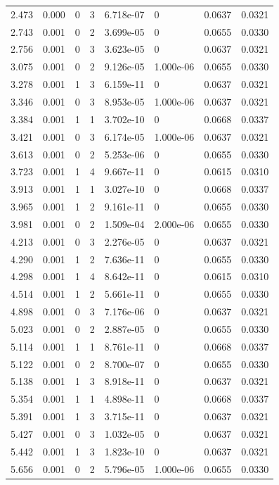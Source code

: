 \documentclass[preview]{standalone}
\begin{document}
{{\begin{tabular}{L{1.2cm}C{1.2cm} C{0.3cm}C{0.5cm} C{1.4cm}C{1.4cm} C{1.4cm}C{1.4cm}}
  2.473  &  0.000  & 0     &  3 &  6.718e-07  & 0  & 0.0637 &  0.0321   \\ 
  2.743  &  0.001  & 0     &  2 &  3.699e-05  & 0  & 0.0655 &  0.0330   \\ 
  2.756  &  0.001  & 0     &  3 &  3.623e-05  & 0  & 0.0637 &  0.0321   \\ 
  3.075  &  0.001  & 0     &  2 &  9.126e-05  & 1.000e-06  & 0.0655 &  0.0330   \\ 
  3.278  &  0.001  & 1     &  3 &  6.159e-11  & 0  & 0.0637 &  0.0321   \\ 
  3.346  &  0.001  & 0     &  3 &  8.953e-05  & 1.000e-06  & 0.0637 &  0.0321   \\ 
  3.384  &  0.001  & 1     &  1 &  3.702e-10  & 0  & 0.0668 &  0.0337   \\ 
  3.421  &  0.001  & 0     &  3 &  6.174e-05  & 1.000e-06  & 0.0637 &  0.0321   \\ 
  3.613  &  0.001  & 0     &  2 &  5.253e-06  & 0  & 0.0655 &  0.0330   \\ 
  3.723  &  0.001  & 1     &  4 &  9.667e-11  & 0  & 0.0615 &  0.0310   \\ 
  3.913  &  0.001  & 1     &  1 &  3.027e-10  & 0  & 0.0668 &  0.0337   \\ 
  3.965  &  0.001  & 1     &  2 &  9.161e-11  & 0  & 0.0655 &  0.0330   \\ 
  3.981  &  0.001  & 0     &  2 &  1.509e-04  & 2.000e-06  & 0.0655 &  0.0330   \\ 
  4.213  &  0.001  & 0     &  3 &  2.276e-05  & 0  & 0.0637 &  0.0321   \\ 
  4.290  &  0.001  & 1     &  2 &  7.636e-11  & 0  & 0.0655 &  0.0330   \\ 
  4.298  &  0.001  & 1     &  4 &  8.642e-11  & 0  & 0.0615 &  0.0310   \\ 
  4.514  &  0.001  & 1     &  2 &  5.661e-11  & 0  & 0.0655 &  0.0330   \\ 
  4.898  &  0.001  & 0     &  3 &  7.176e-06  & 0  & 0.0637 &  0.0321   \\ 
  5.023  &  0.001  & 0     &  2 &  2.887e-05  & 0  & 0.0655 &  0.0330   \\ 
  5.114  &  0.001  & 1     &  1 &  8.761e-11  & 0  & 0.0668 &  0.0337   \\ 
  5.122  &  0.001  & 0     &  2 &  8.700e-07  & 0  & 0.0655 &  0.0330   \\ 
  5.138  &  0.001  & 1     &  3 &  8.918e-11  & 0  & 0.0637 &  0.0321   \\ 
  5.354  &  0.001  & 1     &  1 &  4.898e-11  & 0  & 0.0668 &  0.0337   \\ 
  5.391  &  0.001  & 1     &  3 &  3.715e-11  & 0  & 0.0637 &  0.0321   \\ 
  5.427  &  0.001  & 0     &  3 &  1.032e-05  & 0  & 0.0637 &  0.0321   \\ 
  5.442  &  0.001  & 1     &  3 &  1.823e-10  & 0  & 0.0637 &  0.0321   \\ 
  5.656  &  0.001  & 0     &  2 &  5.796e-05  & 1.000e-06  & 0.0655 &  0.0330   \\ 
\hline 
\end{tabular} 

}}
\end{document}
